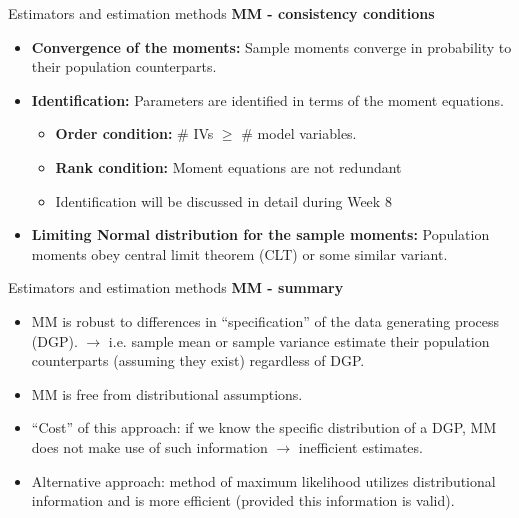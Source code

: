 \documentclass{beamer}
\begin{document}
\begin{frame}{Estimators and estimation methods}
\textbf{MM - consistency conditions}\\
\medskip
\begin{itemize}
  \item \textbf{Convergence of the moments:} Sample moments converge in probability to their population counterparts.
  \medskip
  \item \textbf{Identification:} Parameters are identified in terms of the moment equations.
  \begin{itemize}
      \item \textbf{Order condition:} \# IVs $\geq$ \# model variables.
      \item \textbf{Rank condition:} Moment equations are not redundant
      \item Identification will be discussed in detail during Week 8
  \end{itemize}
  \medskip
  \item \textbf{Limiting Normal distribution for the sample moments:} Population moments obey central limit theorem (CLT) or some similar variant.
\end{itemize}
\end{frame}
\begin{frame}{Estimators and estimation methods}
\textbf{MM - summary}\\
\begin{itemize}
\item MM is robust to differences in ``specification'' of the data generating process (DGP). $\rightarrow$ i.e. sample mean or sample variance estimate their population counterparts (assuming they exist) regardless of DGP.
\medskip
\item MM is free from distributional assumptions.
\medskip
\item ``Cost'' of this approach: if we know the specific distribution of a DGP, MM does not make use of such information $\rightarrow$ inefficient estimates.
\medskip 
\item Alternative approach: method of maximum likelihood utilizes distributional information and is more efficient (provided this information is valid).
\end{itemize}
\end{frame}
\end{document}
